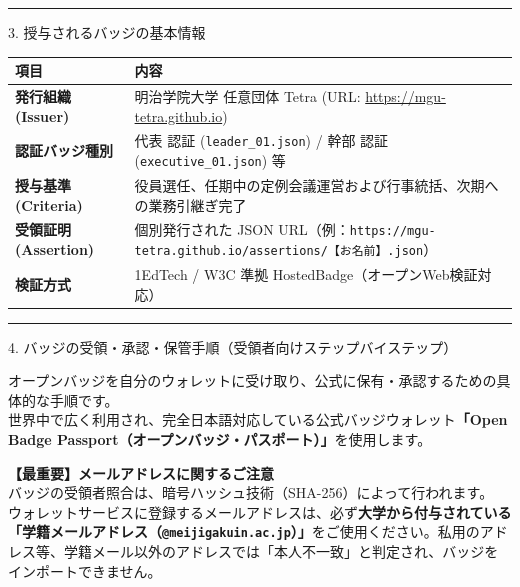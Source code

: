 \documentclass[10.5pt,a4paper]{ltjsarticle}
\newcommand{\mysection}[1]{%
    \vspace{2mm}%
    {\fontsize{12pt}{14pt}\selectfont\bfseries\color{TetraDarkBlue}%
    \rule[-2pt]{3pt}{12pt}\hspace{5pt}#1}%
    \vspace{1.5mm}%
}
\begin{document}
\mysection{3. 授与されるバッジの基本情報}

\vspace{1mm}
\begin{center}
    \renewcommand{\arraystretch}{1.2}
    \fontsize{9pt}{12pt}\selectfont
    \begin{tabular}{p{3.6cm} p{11.8cm}}
        \toprule
        \textbf{項目} & \textbf{内容} \\
        \midrule
        \textbf{発行組織 (Issuer)} & 明治学院大学 任意団体 Tetra (URL: \url{https://mgu-tetra.github.io}) \\
        \textbf{認証バッジ種別} & 代表 認証 (\texttt{leader\_01.json}) / 幹部 認証 (\texttt{executive\_01.json}) 等 \\
        \textbf{授与基準 (Criteria)} & 役員選任、任期中の定例会議運営および行事統括、次期への業務引継ぎ完了 \\
        \textbf{受領証明 (Assertion)} & 個別発行された JSON URL（例：\texttt{https://mgu-tetra.github.io/assertions/【お名前】.json}） \\
        \textbf{検証方式} & 1EdTech / W3C 準拠 HostedBadge（オープンWeb検証対応） \\
        \bottomrule
    \end{tabular}
\end{center}

\newpage


\mysection{4. バッジの受領・承認・保管手順（受領者向けステップバイステップ）}

オープンバッジを自分のウォレットに受け取り、公式に保有・承認するための具体的な手順です。\\
世界中で広く利用され、完全日本語対応している公式バッジウォレット\textbf{「Open Badge Passport（オープンバッジ・パスポート）」}を使用します。

\vspace{1mm}

\begin{alertframe}
    \textbf{\color{AlertRed}【最重要】メールアドレスに関するご注意} \\
    バッジの受領者照合は、暗号ハッシュ技術（SHA-256）によって行われます。\\
    ウォレットサービスに登録するメールアドレスは、必ず\textbf{大学から付与されている「学籍メールアドレス（\texttt{@meijigakuin.ac.jp}）」}をご使用ください。私用のアドレス等、学籍メール以外のアドレスでは「本人不一致」と判定され、バッジをインポートできません。
\end{alertframe}
\end{document}
